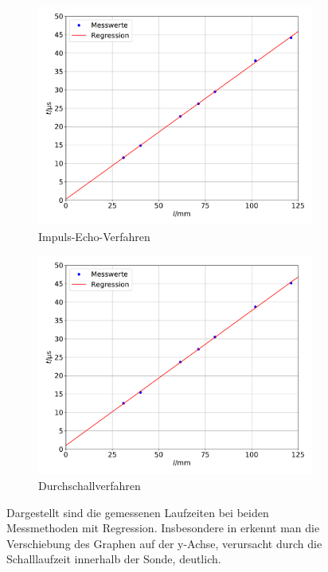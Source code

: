 \begin{figure}
  \centering
  \begin{subfigure}{0.49\textwidth}
    \centering
    \includegraphics[width=\textwidth]{Imp.pdf}
    \caption{Impuls-Echo-Verfahren}
    \label{abb:1}
  \end{subfigure}
  \begin{subfigure}{0.49\textwidth}
    \centering
    \includegraphics[width=\textwidth]{Dur.pdf}
    \caption{Durchschallverfahren}
    \label{abb:2}
  \end{subfigure}
  \caption{Dargestellt sind die gemessenen Laufzeiten bei beiden Messmethoden mit Regression.
  Insbesondere in  erkennt man die Verschiebung des Graphen auf der y-Achse,
  verursacht durch die Schalllaufzeit innerhalb der Sonde, deutlich.}
\end{figure}

